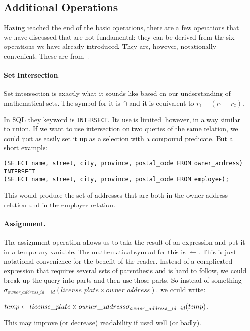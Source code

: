 \subsection*{Additional Operations}
Having reached the end of the basic operations, there are a few operations that we have discussed that are not fundamental: they can be derived from the six operations we have already introduced. They are, however, notationally convenient. These are from~\cite{dsc}:

\paragraph{Set Intersection.} Set intersection is exactly what it sounds like based on our understanding of mathematical sets. The symbol for it is $\cap$ and it is equivalent to $r_{1} - (r_{1} - r_{2})$.

In SQL they keyword is \texttt{INTERSECT}. Its use is limited, however, in a way similar to union. If we want to use intersection on two queries of the same relation, we could just as easily set it up as a selection with a compound predicate. But a short example:

\texttt{(SELECT name, street, city, province, postal\_code FROM owner\_address)\\ 
INTERSECT\\ 
(SELECT name, street, city, province, postal\_code FROM employee);}

This would produce the set of addresses that are both in the owner address relation and in the employee relation.

\paragraph{Assignment.} The assignment operation allows us to take the result of an expression and put it in a temporary variable. The mathematical symbol for this is $\leftarrow$. This is just notational convenience for the benefit of the reader. Instead of a complicated expression that requires several sets of parenthesis and is hard to follow, we could break up the query into parts and then use those parts. So instead of something $\sigma_{owner\_address\_id = id}( license\_plate \times owner\_address )$. we could write: 

$temp \leftarrow license\_plate \times owner\_address\\
\sigma_{owner\_address\_id = id}( temp ) $.

This may improve (or decrease) readability if used well (or badly).

